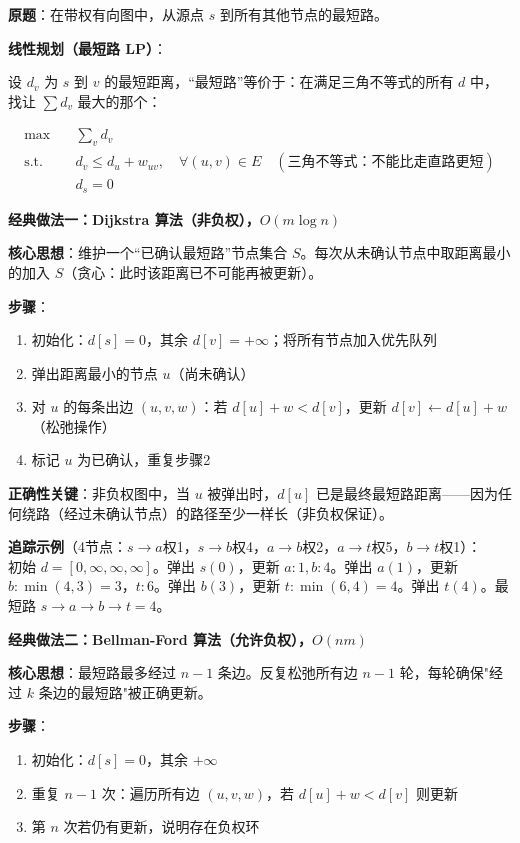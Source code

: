 \documentclass[12pt, a4paper]{ctexart}
\begin{document}
\begin{blackboard}

\textbf{原题}：在带权有向图中，从源点 $s$ 到所有其他节点的最短路。

\textbf{线性规划（最短路 LP）}：

设 $d_v$ 为 $s$ 到 $v$ 的最短距离，``最短路''等价于：在满足三角不等式的所有 $d$ 中，找让 $\sum d_v$ 最大的那个：

\begin{align}
\max \quad & \sum_{v} d_v \\
\text{s.t.} \quad & d_v \leq d_u + w_{uv}, \quad \forall (u,v) \in E \quad (\text{三角不等式：不能比走直路更短}) \\
& d_s = 0
\end{align}

\textbf{经典做法一：Dijkstra 算法（非负权），$O(m\log n)$}

\textbf{核心思想}：维护一个``已确认最短路''节点集合 $S$。每次从未确认节点中取距离最小的加入 $S$（贪心：此时该距离已不可能再被更新）。

\textbf{步骤}：
\begin{enumerate}
    \item 初始化：$d[s]=0$，其余 $d[v]=+\infty$；将所有节点加入优先队列
    \item 弹出距离最小的节点 $u$（尚未确认）
    \item 对 $u$ 的每条出边 $(u,v,w)$：若 $d[u]+w < d[v]$，更新 $d[v] \leftarrow d[u]+w$（松弛操作）
    \item 标记 $u$ 为已确认，重复步骤2
\end{enumerate}

\textbf{正确性关键}：非负权图中，当 $u$ 被弹出时，$d[u]$ 已是最终最短路距离——因为任何绕路（经过未确认节点）的路径至少一样长（非负权保证）。

\textbf{追踪示例}（4节点：$s\to a$权1，$s\to b$权4，$a\to b$权2，$a\to t$权5，$b\to t$权1）：\\
初始 $d=[0,\infty,\infty,\infty]$。弹出 $s(0)$，更新 $a:1, b:4$。弹出 $a(1)$，更新 $b:\min(4,3)=3$，$t:6$。弹出 $b(3)$，更新 $t:\min(6,4)=4$。弹出 $t(4)$。最短路 $s\to a\to b\to t = 4$。

\textbf{经典做法二：Bellman-Ford 算法（允许负权），$O(nm)$}

\textbf{核心思想}：最短路最多经过 $n-1$ 条边。反复松弛所有边 $n-1$ 轮，每轮确保"经过 $k$ 条边的最短路"被正确更新。

\textbf{步骤}：
\begin{enumerate}
    \item 初始化：$d[s]=0$，其余 $+\infty$
    \item 重复 $n-1$ 次：遍历所有边 $(u,v,w)$，若 $d[u]+w < d[v]$ 则更新
    \item 第 $n$ 次若仍有更新，说明存在负权环
\end{enumerate}


\end{blackboard}
\end{document}
